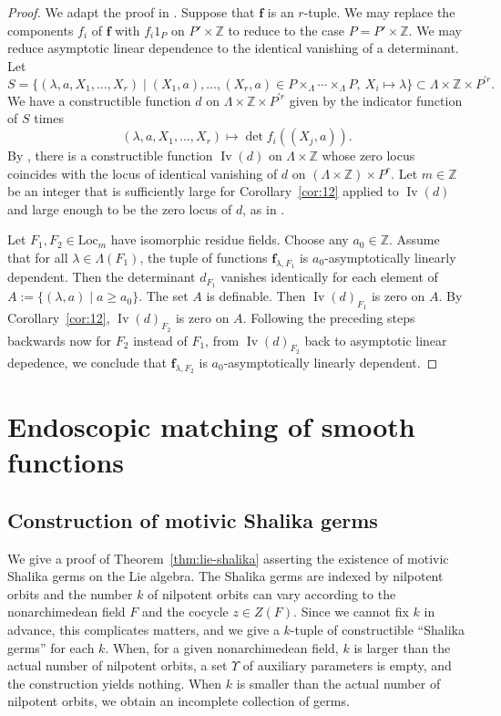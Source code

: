 \documentclass[12pt]{amsart}
\newcommand{\op}[1]{\operatorname{#1}}
\newcommand{\ring}[1]{{\mathbb #1}}
\newcommand{\locus}[1]{\op{Iv}(#1)}
\def\Y{\Upsilon}
\def\bf{\mathbf f}
\newcommand{\Loc}{\mathrm{Loc}}
\theoremstyle{plain}
\theoremstyle{definition}
\begin{document}
\begin{proof} We adapt the proof in \cite{CGH2}. Suppose that $\bf$ is
  an $r$-tuple.  We may replace the components $f_i$ of $\bf$ with
  $f_i 1_P$ on $P'\times\ring{Z}$ to reduce to the case
  $P=P'\times\ring{Z}$.  We may reduce asymptotic linear dependence to
  the identical vanishing of a determinant.  Let
\[
S = \{(\lambda,a,X_1,\ldots,X_r)\mid (X_1,a),\ldots,(X_r,a)\in P\times_\Lambda
\cdots\times_\Lambda 
P,~X_i\mapsto \lambda\} \subset \Lambda\times\ring{Z}\times P^{'r}.
\]
We have a constructible function $d$ on $\Lambda\times\ring{Z}\times P^{'r}$
given by the indicator function of $S$ times
\[
(\lambda,a,X_1,\ldots,X_r)\mapsto 
\det f_i((X_j,a)).
\]
By \cite{CGH1}, there is a constructible function $\locus{d}$ on
$\Lambda\times\ring{Z}$ whose zero locus coincides with the locus of
identical vanishing of $d$ on $(\Lambda\times\ring{Z})\times P^r$.
Let $m\in\ring{Z}$ be an integer that is sufficiently large for
Corollary~\ref{cor:12} applied to $\locus{d}$ and large enough to be
the zero locus of $d$, as in \cite{CGH1}.

Let $F_1,F_2\in\Loc_m$ have isomorphic residue fields.  Choose any
$a_0\in\ring{Z}$.  Assume that for all $\lambda\in \Lambda(F_1)$, the
tuple of functions $\bf_{\lambda,F_1}$ is $a_0$-asymptotically
linearly dependent.  Then the determinant $d_{F_1}$ vanishes identically for each
element of $A:=\{(\lambda,a)\mid a\ge a_0\}$.  The set $A$ is
definable.  Then $\locus{d}_{F_1}$ is zero on $A$.  By
Corollary~\ref{cor:12}, $\locus{d}_{F_2}$ is zero on $A$.  Following
the preceding steps backwards now for $F_2$ instead of $F_1$, from
$\locus{d}_{F_2}$ back to asymptotic linear depedence, we conclude
that $\bf_{\lambda,F_2}$ is $a_0$-asymptotically linearly dependent.
\end{proof}



\section{Endoscopic matching of smooth functions}


\subsection{Construction of motivic Shalika germs}\label{sec:msg}

We give a proof of Theorem~\ref{thm:lie-shalika} asserting the
existence of motivic Shalika germs on the Lie algebra.  The Shalika
germs are indexed by nilpotent orbits and the number $k$ of nilpotent
orbits can vary according to the nonarchimedean field $F$ and the
cocycle $z\in Z(F)$.  Since we cannot fix $k$ in advance, this
complicates matters, and we give a $k$-tuple of constructible
``Shalika germs'' for each $k$.  When, for a given nonarchimedean
field, $k$ is larger than the actual number of nilpotent orbits, a
set $\Y$ of auxiliary parameters is empty, and the construction yields
nothing.  When $k$ is smaller than the actual number of nilpotent
orbits, we obtain an incomplete collection of germs.
\end{document}
